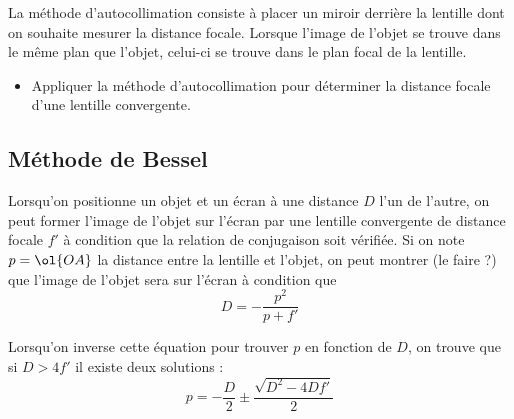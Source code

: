 \documentclass[a4paper]{tp}
\begin{document}
La méthode d'autocollimation consiste à placer un miroir derrière la lentille dont on souhaite mesurer la distance focale. Lorsque l'image de l'objet se trouve dans le même plan que l'objet, celui-ci se trouve dans le plan focal de la lentille.


\label{sub:autocollimation}
\begin{center}

\begin{itemize}
  \item Appliquer la méthode d'autocollimation pour déterminer la distance focale d'une lentille convergente.
\end{itemize}

\end{center}
\subsection{Méthode de Bessel}%
\label{sub:methode_de_bessel}

Lorsqu'on positionne un objet et un écran à une distance $D$ l'un de l'autre, on peut former l'image de l'objet sur l'écran par une lentille convergente de distance focale $f'$  à condition que la relation de conjugaison soit vérifiée. Si on note $p=\ol{OA}$ la distance entre la lentille et l'objet, on peut montrer (le faire ?) que l'image de l'objet sera sur l'écran à condition que 
\begin{equation*}
  D = -\frac{p^2}{p + f'}
\end{equation*}

Lorsqu'on inverse cette équation pour trouver $p$ en fonction de $D$, on trouve que si $D>4f'$ il existe deux solutions :
\begin{equation*}
  p = -\frac{D}{2}\pm \frac{\sqrt{D^2-4Df'}}{2}
\end{equation*}
\end{document}
